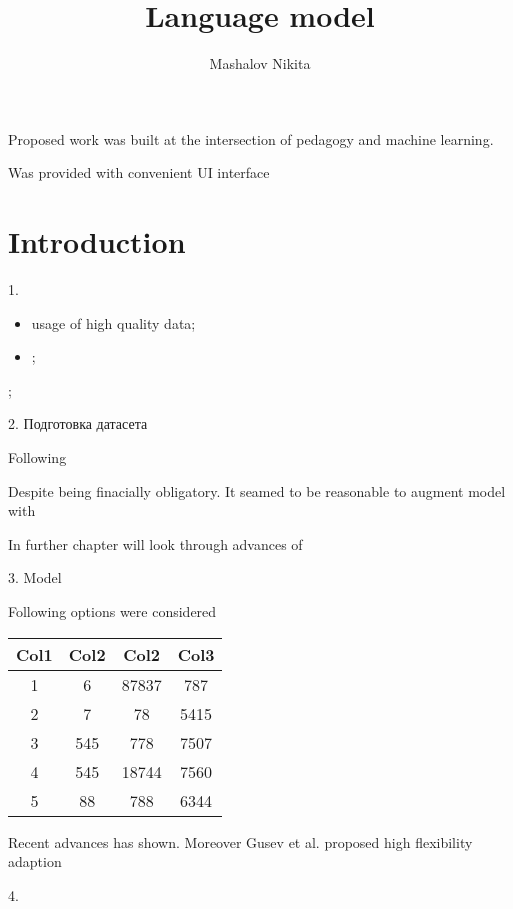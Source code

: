 \documentclass{mipt-thesis-bs}
\title{Language model}
\author{Mashalov Nikita}
\begin{document}
Proposed work was built at the intersection of pedagogy and machine learning. 

Was provided with convenient UI interface 

\chapter{Introduction}

1. 

\begin{itemize}
    \item usage of high quality data;
    \item ;
\end{itemize};

2. Подготовка датасета


Following 

Despite being finacially obligatory. It seamed to be reasonable
to augment model with  

In further chapter will look through advances of 


3. Model 

Following options were considered


\begin{center}
\begin{tabular}{||c c c c||} 
     \hline
     Col1 & Col2 & Col2 & Col3 \\ [0.5ex] 
     \hline\hline
     1 & 6 & 87837 & 787 \\ 
     \hline
     2 & 7 & 78 & 5415 \\
     \hline
     3 & 545 & 778 & 7507 \\
     \hline
     4 & 545 & 18744 & 7560 \\
     \hline
     5 & 88 & 788 & 6344 \\ [1ex] 
     \hline
\end{tabular}
\end{center}

Recent advances has shown. Moreover Gusev et al. proposed high 
flexibility adaption


4. 
\end{document}
